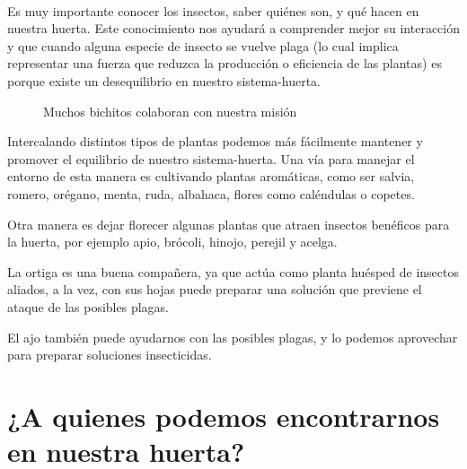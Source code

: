 \documentclass[../main.tex]{subfiles}
\begin{document}
\hfill\\

\begin{recuadroV}
    Es muy importante conocer los insectos, saber quiénes son, y qué hacen en nuestra huerta. Este conocimiento nos ayudará a comprender mejor su interacción y que cuando alguna especie de insecto se vuelve plaga (lo cual implica representar una fuerza que reduzca la producción o eficiencia de las plantas) es porque existe un desequilibrio en nuestro sistema-huerta.
\end{recuadroV}

\begin{wrapfigure}[15]{i}[0cm]{0.65\textwidth}
    \centering
    \caption*{\color{CompostGreen!50!black}Muchos bichitos colaboran con nuestra misión}
    \label{tutoraje1}
\end{wrapfigure}

Intercalando distintos tipos de plantas podemos más fácilmente mantener y promover el equilibrio de nuestro sistema-huerta. Una vía para manejar el entorno de esta manera es cultivando plantas aromáticas, como ser salvia, romero, orégano, menta, ruda, albahaca, flores como caléndulas o copetes.

Otra manera es dejar florecer algunas plantas que atraen insectos benéficos para la huerta, por ejemplo apio, brócoli, hinojo, perejil y acelga.

La ortiga es una buena compañera, ya que actúa como planta huésped de insectos aliados, a la vez, con sus hojas puede preparar una solución que previene el ataque de las posibles plagas.

El ajo también puede ayudarnos con las posibles plagas, y lo podemos aprovechar para preparar soluciones insecticidas.



\section{¿A quienes podemos encontrarnos en nuestra huerta?}
\end{document}
